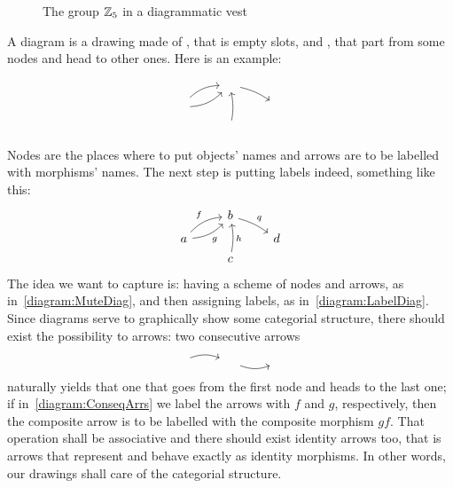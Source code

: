 \begin{figure}
\centering

\caption{The group \(\mathbb Z_5\) in a diagrammatic vest}
\end{figure}

A diagram is a drawing made of , that is empty slots, and , that part from some nodes and head to other ones. Here is an example:
\begin{equation}\begin{tikzcd}[row sep=tiny]
  & \phantom\square \ar[dr, bend left=10] \\
\phantom\square \ar[ur, bend left=20] \ar[ur, bend right=20, swap] & & \phantom\square  \\
  & \phantom\square \ar[uu, bend right=10, swap] 
\end{tikzcd}\label{diagram:MuteDiag}\end{equation}
%
Nodes are the places where to put objects' names and arrows are to be labelled with morphisms' names. The next step is putting labels indeed, something like this:
\begin{equation}\begin{tikzcd}[row sep=tiny]
  & b \ar["q", dr, bend left=10] \\
a \arrow["f", ur, bend left=20] \arrow["g", ur, bend right=20, swap] & & d  \\
  & c \arrow["h", uu, bend right=10, swap] 
\end{tikzcd}\label{diagram:LabelDiag}\end{equation}
%
The idea we want to capture is: having a scheme of nodes and arrows, as in~\eqref{diagram:MuteDiag}, and then assigning labels, as in~\eqref{diagram:LabelDiag}. Since diagrams serve to graphically show some categorial structure, there should exist the possibility to  arrows: two consecutive arrows
\begin{equation}\begin{tikzcd}
\phantom\square \ar[r, bend left=20] & \phantom\square \ar[r, swap, bend right=20] & \phantom\square
\end{tikzcd}\label{diagram:ConseqArrs}\end{equation}
naturally yields that one that goes from the first node and heads to the last one; if in~\eqref{diagram:ConseqArrs} we label the arrows with \(f\) and \(g\), respectively, then the composite arrow is to be labelled with the composite morphism \(gf\). That operation shall be associative and there should exist identity arrows too, that is arrows that represent and behave exactly as identity morphisms. In other words, our drawings shall care of the categorial structure.


